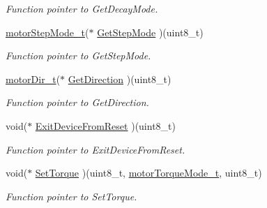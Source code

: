 \begin{DoxyCompactItemize}
\begin{DoxyCompactList}\small\item\em Function pointer to Get\+Decay\+Mode. \end{DoxyCompactList}\item 
\mbox{\label{structmotor_drv__t_a9d5fa996525747b3e613d77159967516}} 
\mbox{\hyperlink{group___device___step__mode_gaa8024e6a2453b22a104bd0a8a364dd80}{motor\+Step\+Mode\+\_\+t}}($\ast$ \mbox{\hyperlink{structmotor_drv__t_a9d5fa996525747b3e613d77159967516}{Get\+Step\+Mode}} )(uint8\+\_\+t)
\begin{DoxyCompactList}\small\item\em Function pointer to Get\+Step\+Mode. \end{DoxyCompactList}\item 
\mbox{\label{structmotor_drv__t_ac034d04e292b18a6e53d9504cc6cc7c6}} 
\mbox{\hyperlink{group___device___direction___options_ga4eaf4196e4d11d552f58f3fab218a8c7}{motor\+Dir\+\_\+t}}($\ast$ \mbox{\hyperlink{structmotor_drv__t_ac034d04e292b18a6e53d9504cc6cc7c6}{Get\+Direction}} )(uint8\+\_\+t)
\begin{DoxyCompactList}\small\item\em Function pointer to Get\+Direction. \end{DoxyCompactList}\item 
\mbox{\label{structmotor_drv__t_ab65630e5db5d091f9700d0e2372d391a}} 
void($\ast$ \mbox{\hyperlink{structmotor_drv__t_ab65630e5db5d091f9700d0e2372d391a}{Exit\+Device\+From\+Reset}} )(uint8\+\_\+t)
\begin{DoxyCompactList}\small\item\em Function pointer to Exit\+Device\+From\+Reset. \end{DoxyCompactList}\item 
\mbox{\label{structmotor_drv__t_a617a4d9bdb7ed8045d0b682ff97fe781}} 
void($\ast$ \mbox{\hyperlink{structmotor_drv__t_a617a4d9bdb7ed8045d0b682ff97fe781}{Set\+Torque}} )(uint8\+\_\+t, \mbox{\hyperlink{group___torque__mode_ga41f68f90d74c690988fdd6d949c7a75d}{motor\+Torque\+Mode\+\_\+t}}, uint8\+\_\+t)
\begin{DoxyCompactList}\small\item\em Function pointer to Set\+Torque. \end{DoxyCompactList}\item 

\end{DoxyCompactItemize}
